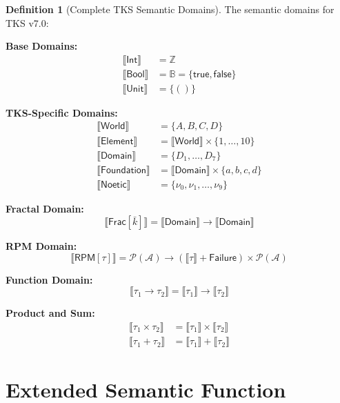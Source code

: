 \documentclass[11pt,twoside,openright]{book}
\theoremstyle{definition}
\newtheorem{definition}{Definition}[chapter]
\theoremstyle{plain}
\theoremstyle{remark}
\newcommand{\sem}[1]{\llbracket #1 \rrbracket}
\newcommand{\Acquisitions}{\mathcal{A}}
\newcommand{\noe}[1]{\nu_{#1}}
\begin{document}
\begin{definition}[Complete TKS Semantic Domains]
\label{def:semantic-domains}
The semantic domains for TKS v7.0:

\textbf{Base Domains:}
\begin{align}
\sem{\mathsf{Int}} &= \mathbb{Z} \\
\sem{\mathsf{Bool}} &= \mathbb{B} = \{\mathsf{true}, \mathsf{false}\} \\
\sem{\mathsf{Unit}} &= \{()\}
\end{align}

\textbf{TKS-Specific Domains:}
\begin{align}
\sem{\mathsf{World}} &= \{A, B, C, D\} \\
\sem{\mathsf{Element}} &= \sem{\mathsf{World}} \times \{1, \ldots, 10\} \\
\sem{\mathsf{Domain}} &= \{D_1, \ldots, D_7\} \\
\sem{\mathsf{Foundation}} &= \sem{\mathsf{Domain}} \times \{a, b, c, d\} \\
\sem{\mathsf{Noetic}} &= \{\noe{0}, \noe{1}, \ldots, \noe{9}\}
\end{align}

\textbf{Fractal Domain:}
\[
\sem{\mathsf{Frac}[\bar{k}]} = \sem{\mathsf{Domain}} \to \sem{\mathsf{Domain}}
\]

\textbf{RPM Domain:}
\[
\sem{\mathsf{RPM}[\tau]} = \mathcal{P}(\Acquisitions) \to (\sem{\tau} + \mathsf{Failure}) \times \mathcal{P}(\Acquisitions)
\]

\textbf{Function Domain:}
\[
\sem{\tau_1 \to \tau_2} = \sem{\tau_1} \to \sem{\tau_2}
\]

\textbf{Product and Sum:}
\begin{align}
\sem{\tau_1 \times \tau_2} &= \sem{\tau_1} \times \sem{\tau_2} \\
\sem{\tau_1 + \tau_2} &= \sem{\tau_1} + \sem{\tau_2}
\end{align}
\end{definition}

\section{Extended Semantic Function}
\end{document}
